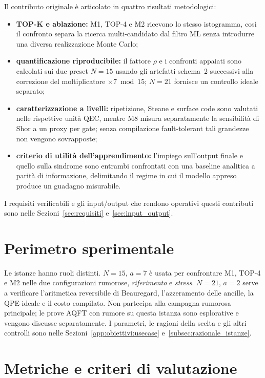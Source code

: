 \begin{onehalfspace}
Il contributo originale è articolato in quattro risultati metodologici:

\begin{itemize}
    \item \textbf{TOP-K e ablazione:} M1, TOP-4 e M2 ricevono lo stesso istogramma, così il confronto separa la ricerca multi-candidato dal filtro \ac{ML} senza introdurre una diversa realizzazione Monte Carlo;
    \item \textbf{quantificazione riproducibile:} il fattore $\rho$ e i confronti appaiati sono calcolati sui due preset $N=15$ usando gli artefatti schema~2 successivi alla correzione del moltiplicatore $\times7\bmod15$; $N=21$ fornisce un controllo ideale separato;
    \item \textbf{caratterizzazione a livelli:} ripetizione, Steane e surface code sono valutati nelle rispettive unità QEC, mentre M8 misura separatamente la sensibilità di Shor a un proxy per gate; senza compilazione fault-tolerant tali grandezze non vengono sovrapposte;
    \item \textbf{criterio di utilità dell'apprendimento:} l'impiego sull'output finale e quello sulla sindrome sono entrambi confrontati con una baseline analitica a parità di informazione, delimitando il regime in cui il modello appreso produce un guadagno misurabile.
\end{itemize}

I requisiti verificabili e gli input/output che rendono operativi questi contributi sono nelle Sezioni~\ref{sec:requisiti} e~\ref{sec:input_output}.

\section{Perimetro sperimentale}
\label{sec:use_case}

Le istanze hanno ruoli distinti. $N=15$, $a=7$ è usata per confrontare M1, TOP-4 e M2 nelle due configurazioni rumorose, \emph{riferimento} e \emph{stress}. $N=21$, $a=2$ serve a verificare l'aritmetica reversibile di Beauregard, l'azzeramento delle ancille, la QPE ideale e il costo compilato. Non partecipa alla campagna rumorosa principale; le prove AQFT con rumore su questa istanza sono esplorative e vengono discusse separatamente. I parametri, le ragioni della scelta e gli altri controlli sono nelle Sezioni~\ref{app:obiettivi:usecase} e~\ref{subsec:razionale_istanze}.

\section{Metriche e criteri di valutazione}
\label{sec:metriche}


\end{onehalfspace}
